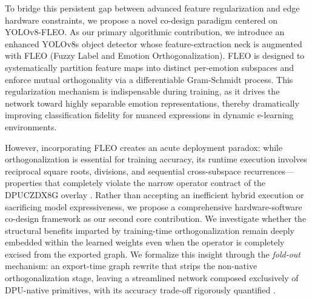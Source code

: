 \documentclass[algorithms,article,submit,moreauthors]{Definitions/mdpi}
\begin{document}
To bridge this persistent gap between advanced feature regularization and edge hardware constraints, we propose a novel co-design paradigm centered on YOLOv8-FLEO. As our primary algorithmic contribution, we introduce an enhanced YOLOv8s object detector whose feature-extraction neck is augmented with FLEO (Fuzzy Label \citep{bib26} and Emotion Orthogonalization). FLEO is designed to systematically partition feature maps into distinct per-emotion subspaces and enforce mutual orthogonality via a differentiable Gram-Schmidt process. This regularization mechanism is indispensable during training, as it drives the network toward highly separable emotion representations, thereby dramatically improving classification fidelity for nuanced expressions in dynamic e-learning environments.

However, incorporating FLEO creates an acute deployment paradox: while orthogonalization is essential for training accuracy, its runtime execution involves reciprocal square roots, divisions, and sequential cross-subspace recurrences—properties that completely violate the narrow operator contract of the DPUCZDX8G overlay \citep{bib1}. Rather than accepting an inefficient hybrid execution or sacrificing model expressiveness, we propose a comprehensive hardware-software co-design framework as our second core contribution. We investigate whether the structural benefits imparted by training-time orthogonalization remain deeply embedded within the learned weights even when the operator is completely excised from the exported graph. We formalize this insight through the \emph{fold-out} mechanism: an export-time graph rewrite that strips the non-native orthogonalization stage, leaving a streamlined network composed exclusively of DPU-native primitives, with its accuracy trade-off rigorously quantified \citep{bib4}.
\end{document}
